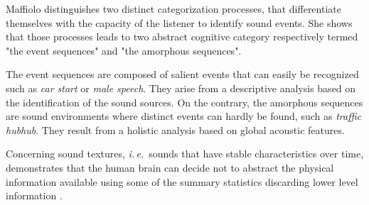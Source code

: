 \documentclass[12pt]{elsarticle}
\newcommand{\ie}{\emph{i.\,e.}}
\begin{document}
Maffiolo \cite{maffiolo_caracterisation_1999} distinguishes two distinct categorization processes, that differentiate themselves with the capacity of the listener to identify sound events. She shows that those processes leads to two abstract cognitive category respectively termed "the event sequences" and "the amorphous sequences".


The event sequences are composed of salient events that can easily be recognized such as \emph{car start} or \emph{male speech}. They arise from a descriptive analysis based on the identification of the sound sources. On the contrary, the amorphous sequences are sound environments where distinct events can hardly be found, such as \emph{traffic hubhub}. They result from a holistic analysis based on global acoustic features.


Concerning sound textures, \ie~sounds that have stable characteristics over time, \cite{mcdermott2011sound,mcdermott2013summary} demonstrates that the human brain can decide not to abstract the physical information available using some of the summary statistics discarding lower level information \cite{nelken2013ear}.

\end{document}
